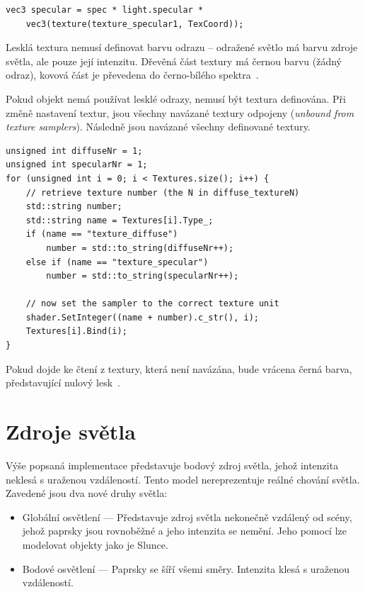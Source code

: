 \documentclass[thesis=M,czech]{FITthesis}[2019/12/23]
\begin{document}
\begin{verbatim}
vec3 specular = spec * light.specular * 
    vec3(texture(texture_specular1, TexCoord));
\end{verbatim}

Lesklá textura nemusí definovat barvu odrazu -- odražené světlo má barvu zdroje světla, ale pouze její intenzitu. Dřevěná část textury má černou barvu (žádný odraz), kovová část je převedena do černo-bílého spektra~\cite{lopgl_light_maps}.

Pokud objekt nemá používat lesklé odrazy, nemusí být textura definována. Při změně nastavení textur, jsou všechny navázané textury odpojeny (\textit{unbound from texture samplers}). Následně jsou navázané všechny definované textury.

\begin{verbatim}
unsigned int diffuseNr = 1;
unsigned int specularNr = 1;
for (unsigned int i = 0; i < Textures.size(); i++) {
    // retrieve texture number (the N in diffuse_textureN)
    std::string number;
    std::string name = Textures[i].Type_;
    if (name == "texture_diffuse")
        number = std::to_string(diffuseNr++);
    else if (name == "texture_specular")
        number = std::to_string(specularNr++);

    // now set the sampler to the correct texture unit
    shader.SetInteger((name + number).c_str(), i);
    Textures[i].Bind(i);
}
\end{verbatim}

Pokud dojde ke čtení z textury, která není navázána, bude vrácena černá barva, představující nulový lesk~\cite{unbound_texture}.

\section{Zdroje světla}

Výše popsaná implementace představuje bodový zdroj světla, jehož intenzita neklesá s uraženou vzdáleností. Tento model nereprezentuje reálné chování světla. Zavedené jsou dva nové druhy světla:

\begin{itemize}
\item Globální osvětlení --- Představuje zdroj světla nekonečně vzdálený od scény, jehož paprsky jsou rovnoběžné a jeho intenzita se nemění. Jeho pomocí lze modelovat objekty jako je Slunce. 

\item Bodové osvětlení --- Paprsky se šíří všemi směry. Intenzita klesá s ura\-že\-nou vzdáleností.
\end{itemize}
\end{document}
